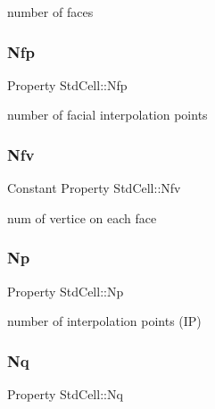 number of faces 

\mbox{\label{class_std_cell_ae3f5999a32fa305191bfe5f95d076b14}} 
\subsubsection{\texorpdfstring{Nfp}{Nfp}}
{\footnotesize\ttfamily Property Std\+Cell\+::\+Nfp\hspace{0.3cm}{\ttfamily [protected]}}



number of facial interpolation points 

\mbox{\label{class_std_cell_a32ea0a46ccb1beecc6c377b632b4b61c}} 
\subsubsection{\texorpdfstring{Nfv}{Nfv}}
{\footnotesize\ttfamily Constant Property Std\+Cell\+::\+Nfv}



num of vertice on each face 

\mbox{\label{class_std_cell_a161d8f82735498acb15f198624595737}} 
\subsubsection{\texorpdfstring{Np}{Np}}
{\footnotesize\ttfamily Property Std\+Cell\+::\+Np\hspace{0.3cm}{\ttfamily [protected]}}



number of interpolation points (IP) 

\mbox{\label{class_std_cell_aede2d7d32ffc435a37c1f47af06a1127}} 
\subsubsection{\texorpdfstring{Nq}{Nq}}
{\footnotesize\ttfamily Property Std\+Cell\+::\+Nq\hspace{0.3cm}{\ttfamily [protected]}}



